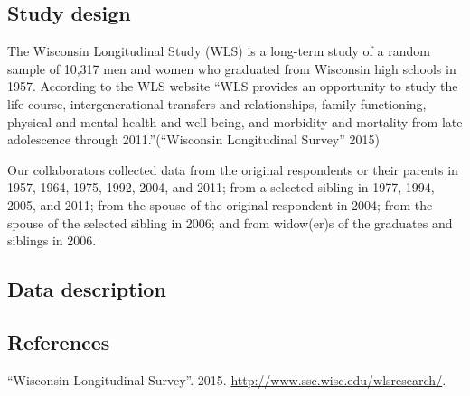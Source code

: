 \documentclass[11pt,]{article}
\begin{document}
\subsection{Study design}\label{study-design}

The Wisconsin Longitudinal Study (WLS) is a long-term study of a random
sample of 10,317 men and women who graduated from Wisconsin high schools
in 1957. According to the WLS website ``WLS provides an opportunity to
study the life course, intergenerational transfers and relationships,
family functioning, physical and mental health and well-being, and
morbidity and mortality from late adolescence through
2011.''(``Wisconsin Longitudinal Survey'' 2015)


Our collaborators collected data from the original respondents or their
parents in 1957, 1964, 1975, 1992, 2004, and 2011; from a selected
sibling in 1977, 1994, 2005, and 2011; from the spouse of the original
respondent in 2004; from the spouse of the selected sibling in 2006; and
from widow(er)s of the graduates and siblings in 2006.

\subsection{Data description}\label{data-description}

\subsection*{References}\label{references}

``Wisconsin Longitudinal Survey''. 2015.
\url{http://www.ssc.wisc.edu/wlsresearch/}.
\end{document}
